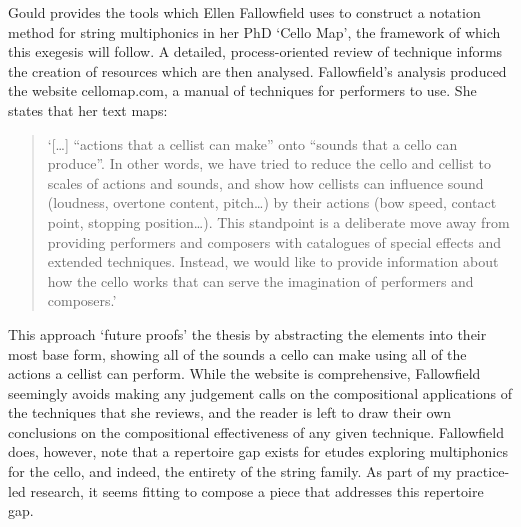 Gould provides the tools which Ellen Fallowfield uses to construct a notation method for string multiphonics in her PhD ‘Cello Map’, the framework of which this exegesis will follow. 
A detailed, process-oriented review of technique informs the creation of resources which are then analysed.\autocite{fallowfieldCelloMapHandbook2009} 
Fallowfield’s analysis produced the website cellomap.com, a manual of techniques for performers to use. 
She states that her text maps:
\begin{quotation}
    ‘[\ldots] “actions that a cellist can make” onto “sounds that a cello can produce”. In other words, we have tried to reduce the cello and cellist to scales of actions and sounds, and show how cellists can influence sound (loudness, overtone content, pitch…) by their actions (bow speed, contact point, stopping position…). This standpoint is a deliberate move away from providing performers and composers with catalogues of special effects and extended techniques. Instead, we would like to provide information about how the cello works that can serve the imagination of performers and composers.’\autocite{fallowfieldCelloMap}
\end{quotation}
This approach ‘future proofs’ the thesis by abstracting the elements into their most base form, showing all of the sounds a cello can make using all of the actions a cellist can perform. 
While the website is comprehensive, Fallowfield seemingly avoids making any judgement calls on the compositional applications of the techniques that she reviews, and the reader is left to draw their own conclusions on the compositional effectiveness of any given technique. 
Fallowfield does, however, note that a repertoire gap exists for etudes exploring multiphonics for the cello, and indeed, the entirety of the string family. 
As part of my practice-led research, it seems fitting to compose a piece that addresses this repertoire gap.

